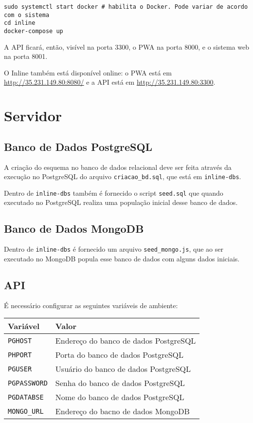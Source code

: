 \documentclass{book}
\begin{document}
\begin{verbatim}
sudo systemctl start docker # habilita o Docker. Pode variar de acordo com o sistema
cd inline
docker-compose up
\end{verbatim}

A API ficará, então, visível na porta 3300, o PWA na porta 8000, e o sistema web
na porta 8001.

O Inline também está disponível online: o PWA está em
\url{http://35.231.149.80:8080/} e a API está em \url{http://35.231.149.80:3300}.

\section{Servidor}
\subsection{Banco de Dados PostgreSQL}

A criação do esquema no banco de dados relacional deve ser feita através da
execução no PostgreSQL do arquivo \verb|criacao_bd.sql|, que está em
\verb|inline-dbs|.

Dentro de \verb|inline-dbs| também é fornecido o script \verb|seed.sql| que
quando executado no PostgreSQL realiza uma população inicial desse banco de
dados.

\subsection{Banco de Dados MongoDB}

Dentro de \verb|inline-dbs| é fornecido um arquivo \verb|seed_mongo.js|, que ao
ser executado no MongoDB popula esse banco de dados com alguns dados iniciais.

\subsection{API}
É necessário configurar as seguintes variáveis de ambiente:

\begin{tabular}{|l|l|}
\hline
Variável & Valor \\
\hline
\verb|PGHOST| & Endereço do banco de dados PostgreSQL \\
\hline
\verb|PHPORT| & Porta do banco de dados PostgreSQL \\
\hline
\verb|PGUSER| & Usuário do banco de dados PostgreSQL \\
\hline
\verb|PGPASSWORD| & Senha do banco de dados PostgreSQL \\
\hline
\verb|PGDATABSE| & Nome do banco de dados PostgreSQL \\
\hline
\verb|MONGO_URL| & Endereço do bacno de dados MongoDB \\
\hline
\end{tabular}
\end{document}
